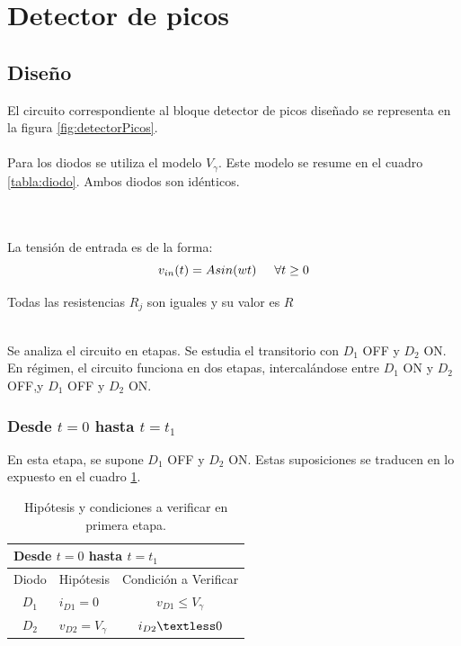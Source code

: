 
\section{Detector de picos}
\subsection{Diseño}
 El circuito correspondiente al bloque  detector de picos diseñado se representa en la figura \ref{fig:detectorPicos}. \\\\
 
 
Para los diodos se utiliza el modelo $V_{\gamma}$. Este modelo se resume en el cuadro \ref{tabla:diodo}. Ambos diodos son idénticos. 

 \\\\
 La tensión de entrada es de la forma:
 \begin{equation*}
 		v_{in}(t) = Asin(wt) \hspace{0.5cm} \forall t\geq 0
 \end{equation*}
 
 Todas las resistencias $R_j$ son iguales y su valor es $R$

\\
Se analiza el circuito en etapas. Se estudia el transitorio con $D_1$ OFF y $D_2$ ON. En régimen, el circuito funciona en dos etapas, intercalándose entre $D_1$ ON y $D_2$ OFF,y $D_1$ OFF y $D_2$ ON. 
\subsubsection{Desde $t=0$ hasta $t=t_1$}
En esta etapa, se supone $D_1$ OFF y $D_2$ ON. Estas suposiciones se traducen en lo expuesto en el cuadro \ref{cuadro:DP1eraEtapa}.


\begin{table}[!htb]
	\centering
	\caption{Hipótesis y condiciones a verificar en primera etapa.}
	\label{cuadro:DP1eraEtapa}
	\begin{tabular}{lll}
		\multicolumn{3}{l}{Desde $t=0$ hasta $t=t_1$}                                                                      \\ \hline
		\multicolumn{1}{|l|}{Diodo} & \multicolumn{1}{l|}{Hipótesis}          & \multicolumn{1}{c|}{Condición a Verificar}             \\ \hline
		\multicolumn{1}{|c|}{$D_1$} & \multicolumn{1}{l|}{$i_{D1}=0$}         & \multicolumn{1}{c|}{$v_{D1}\leq V_\gamma$} \\ \hline
		\multicolumn{1}{|c|}{$D_2$} & \multicolumn{1}{l|}{$v_{D2}= V_\gamma$} & \multicolumn{1}{c|}{$i_{D2}\textless 0$}        \\ \hline
	\end{tabular}
\end{table}

